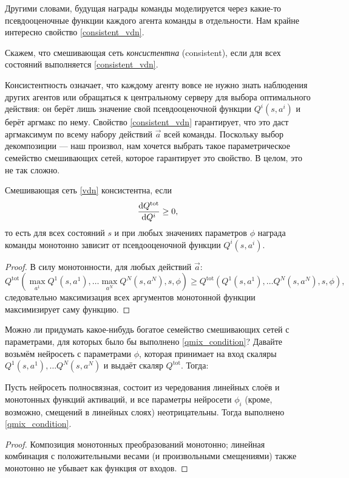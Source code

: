 Другими словами, будущая награды команды моделируется через какие-то псевдооценочные функции каждого агента команды в отдельности. Нам крайне интересно свойство \eqref{consistent_vdn}.

\begin{definition}
Скажем, что смешивающая сеть \emph{консистентна} (consistent), если для всех состояний выполняется \eqref{consistent_vdn}.
\end{definition}

Консистентность означает, что каждому агенту вовсе не нужно знать наблюдения других агентов или обращаться к центральному серверу для выбора оптимального действия: он берёт лишь значение свой псевдооценочной функции $Q^i(s, a^i)$ и берёт аргмакс по нему. Свойство \eqref{consistent_vdn} гарантирует, что это даст аргмаксимум по всему набору действий $\vec{a}$ всей команды. Поскольку выбор декомпозиции --- наш произвол, нам хочется выбрать такое параметрическое семейство смешивающих сетей, которое гарантирует это свойство. В целом, это не так сложно.

\begin{theorem}
Смешивающая сеть \eqref{vdn} консистентна, если
\begin{equation}\label{qmix_condition}
\frac{\mathop{}\!\mathrm{d} Q^{\mathrm{tot}}}{\mathop{}\!\mathrm{d} Q^i} \ge 0,
\end{equation}
то есть для всех состояний $s$ и при любых значениях параметров $\phi$ награда команды монотонно зависит от псевдооценочной функции $Q^i(s, a^i)$.
\begin{proof}
В силу монотонности, для любых действий $\vec{a}$:
$$Q^{\mathrm{tot}}( \max_{a^1} Q^1(s, a^1), \dots \max_{a^N} Q^N(s, a^N), s, \phi) \ge Q^{\mathrm{tot}}( Q^1(s, a^1), \dots Q^N(s, a^N), s, \phi),$$
следовательно максимизация всех аргументов монотонной функции максимизирует саму функцию.
\end{proof}
\end{theorem}

Можно ли придумать какое-нибудь богатое семейство смешивающих сетей с параметрами, для которых было бы выполнено \eqref{qmix_condition}? Давайте возьмём нейросеть с параметрами $\phi$, которая принимает на вход скаляры $Q^1(s, a^1), \dots Q^N(s, a^N)$ и выдаёт скаляр $Q^{\mathrm{tot}}$. Тогда:
\begin{proposition}
Пусть нейросеть полносвязная, состоит из чередования линейных слоёв и монотонных функций активаций, и все параметры нейросети $\phi_i$ (кроме, возможно, смещений в линейных слоях) неотрицательны. Тогда выполнено \eqref{qmix_condition}.
\begin{proof}
Композиция монотонных преобразований монотонно; линейная комбинация с положительными весами (и произвольными смещениями) также монотонно не убывает как функция от входов.
\end{proof}
\end{proposition}

